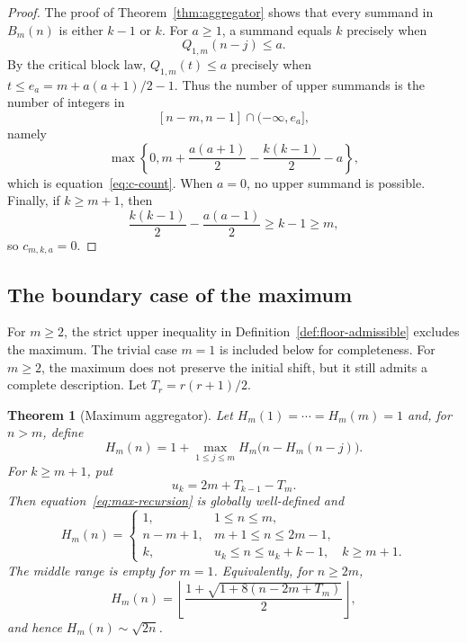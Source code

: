 \documentclass[11pt]{article}
\newtheorem{theorem}{Theorem}[section]
\theoremstyle{definition}
\theoremstyle{remark}
\newcommand{\floor}[1]{\left\lfloor #1\right\rfloor}
\begin{document}
\begin{proof}
The proof of Theorem~\ref{thm:aggregator} shows that every summand in
$B_m(n)$ is either $k-1$ or $k$.  For $a\ge1$, a summand equals $k$
precisely when
\[
Q_{1,m}(n-j)\le a.
\]
By the critical block law, $Q_{1,m}(t)\le a$ precisely when
$t\le e_a=m+a(a+1)/2-1$.  Thus the number of upper summands is the number of
integers in
\[
[n-m,n-1]\cap(-\infty,e_a],
\]
namely
\[
\max\left\{0,m+\frac{a(a+1)}2-\frac{k(k-1)}2-a\right\},
\]
which is equation~\eqref{eq:c-count}.  When $a=0$, no upper summand is
possible.  Finally, if $k\ge m+1$, then
\[
\frac{k(k-1)}2-\frac{a(a-1)}2\ge k-1\ge m,
\]
so $c_{m,k,a}=0$.
\end{proof}

\subsection{The boundary case of the maximum}

For $m\ge2$, the strict upper inequality in
Definition~\ref{def:floor-admissible} excludes the maximum.  The trivial case
$m=1$ is included below for completeness.  For $m\ge2$, the maximum does not
preserve the initial shift, but it still admits a complete description.  Let
$T_r=r(r+1)/2$.

\begin{theorem}[Maximum aggregator]\label{thm:maximum}
Let $H_m(1)=\cdots=H_m(m)=1$ and, for $n>m$, define
\begin{equation}\label{eq:max-recursion}
H_m(n)
=
1+\max_{1\le j\le m}H_m\bigl(n-H_m(n-j)\bigr).
\end{equation}
For $k\ge m+1$, put
\begin{equation}\label{eq:max-start}
u_k=2m+T_{k-1}-T_m.
\end{equation}
Then equation~\eqref{eq:max-recursion} is globally well-defined and
\begin{equation}\label{eq:max-explicit}
H_m(n)=
\begin{cases}
1,&1\le n\le m,\\
n-m+1,&m+1\le n\le2m-1,\\
k,&u_k\le n\le u_k+k-1,\quad k\ge m+1.
\end{cases}
\end{equation}
The middle range is empty for $m=1$.  Equivalently, for $n\ge2m$,
\begin{equation}\label{eq:max-closed-form}
H_m(n)
=
\floor{\frac{1+\sqrt{1+8(n-2m+T_m)}}2},
\end{equation}
and hence $H_m(n)\sim\sqrt{2n}$.
\end{theorem}
\end{document}
